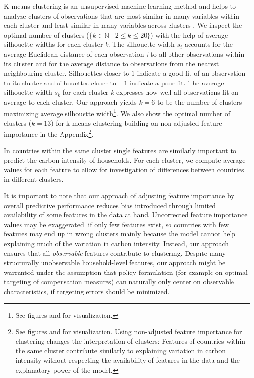 \documentclass[12pt, a4paper]{article}
\begin{document}
K-means clustering is an unsupervised machine-learning method and helps to analyze clusters of observations that are most similar in many variables within each cluster and least similar in many variables across clusters \autocite{MacQueen.1967}. We inspect the optimal number of clusters ($\{k \in \mathbb{N} \mid 2  \leq k \leq 20 \}$) with the help of average silhouette widths \autocite{Rousseeuw.1987} for each cluster \textit{k}. The silhouette width $s_{i}$ accounts for the average Euclidean distance of each observation \textit{i} to all other observations within its cluster and for the average distance to observations from the nearest neighbouring cluster. Silhouettes closer to $1$ indicate a good fit of an observation to its cluster and silhouettes closer to $-1$ indicate a poor fit. The average silhouette width $\overline{s_{k}}$ for each cluster \textit{k} expresses how well all observations fit on average to each cluster. Our approach yields $k = 6$ to be the number of clusters maximizing average silhouette width\footnote{See figures  and  for visualization.}. We also show the optimal number of clusters ($k = 13$) for k-means clustering building on non-adjusted feature importance in the Appendix\footnote{See figures  and  for visualization. Using non-adjusted feature importance for clustering changes the interpretation of clusters: Features of countries within the same cluster contribute similarly to explaining variation in carbon intensity without respecting the availability of features in the data and the explanatory power of the model.}.

In countries within the same cluster single features are similarly important to predict the carbon intensity of households. For each cluster, we compute average values for each feature to allow for investigation of differences between countries in different clusters.%

It is important to note that our approach of adjusting feature importance by overall predictive performance reduces bias introduced through limited availability of some features in the data at hand. Uncorrected feature importance values may be exaggerated, if only few features exist, so countries with few features may end up in wrong clusters mainly because the model cannot help explaining much of the variation in carbon intensity. Instead, our approach ensures that all \textit{observable} features contribute to clustering. Despite many structurally unobservable household-level features, our approach might be warranted under the assumption that policy formulation (for example on optimal targeting of compensation measures) can naturally only center on observable characteristics, if targeting errors should be minimized.
\end{document}
